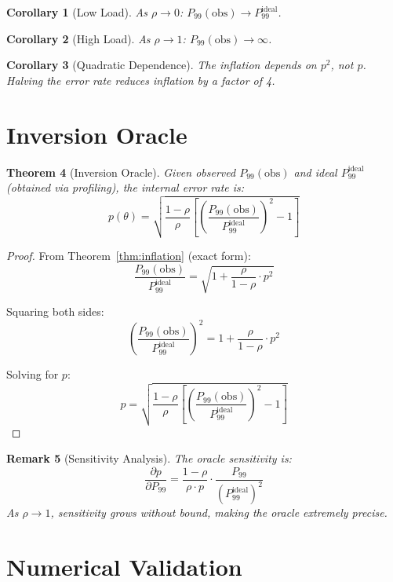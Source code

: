 \documentclass[11pt]{article}
\newtheorem{theorem}{Theorem}[section]
\newtheorem{corollary}[theorem]{Corollary}
\newtheorem{remark}[theorem]{Remark}
\begin{document}
\begin{corollary}[Low Load]
As $\rho \to 0$: $P_{99}(\text{obs}) \to P_{99}^{\text{ideal}}$.
\end{corollary}

\begin{corollary}[High Load]
As $\rho \to 1$: $P_{99}(\text{obs}) \to \infty$.
\end{corollary}

\begin{corollary}[Quadratic Dependence]
The inflation depends on $p^2$, not $p$. Halving the error rate reduces inflation by a factor of 4.
\end{corollary}

\section{Inversion Oracle}
\label{sec:oracle}

\begin{theorem}[Inversion Oracle]
\label{thm:oracle}
Given observed $P_{99}(\text{obs})$ and ideal $P_{99}^{\text{ideal}}$ (obtained via profiling), the internal error rate is:
$$\boxed{p(\theta) = \sqrt{\frac{1-\rho}{\rho} \left[\left(\frac{P_{99}(\text{obs})}{P_{99}^{\text{ideal}}}\right)^2 - 1\right]}}$$
\end{theorem}

\begin{proof}
From Theorem~\ref{thm:inflation} (exact form):
$$\frac{P_{99}(\text{obs})}{P_{99}^{\text{ideal}}} = \sqrt{1 + \frac{\rho}{1-\rho} \cdot p^2}$$

Squaring both sides:
$$\left(\frac{P_{99}(\text{obs})}{P_{99}^{\text{ideal}}}\right)^2 = 1 + \frac{\rho}{1-\rho} \cdot p^2$$

Solving for $p$:
$$p = \sqrt{\frac{1-\rho}{\rho} \left[\left(\frac{P_{99}(\text{obs})}{P_{99}^{\text{ideal}}}\right)^2 - 1\right]}$$
\end{proof}

\begin{remark}[Sensitivity Analysis]
The oracle sensitivity is:
$$\frac{\partial p}{\partial P_{99}} = \frac{1-\rho}{\rho \cdot p} \cdot \frac{P_{99}}{(P_{99}^{\text{ideal}})^2}$$
As $\rho \to 1$, sensitivity grows without bound, making the oracle extremely precise.
\end{remark}

\section{Numerical Validation}
\label{sec:validation}
\end{document}
